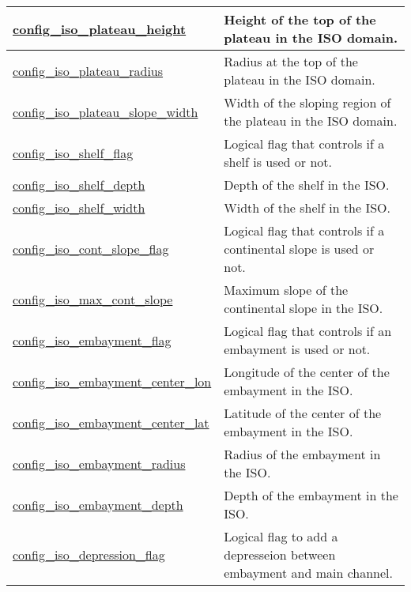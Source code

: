 {\begin{center}
\begin{longtable}{| p{2.0in} || p{4.0in} |}
    \hline
    \hyperref[subsec:nm_sec_config_iso_plateau_height]{config\_iso\_plateau\_height} & Height of the top of the plateau in the ISO domain. \\
    \hline
    \hyperref[subsec:nm_sec_config_iso_plateau_radius]{config\_iso\_plateau\_radius} & Radius at the top of the plateau in the ISO domain. \\
    \hline
    \hyperref[subsec:nm_sec_config_iso_plateau_slope_width]{config\_iso\_plateau\_slope\_\-width} & Width of the sloping region of the plateau in the ISO domain. \\
    \hline
    \hyperref[subsec:nm_sec_config_iso_shelf_flag]{config\_iso\_shelf\_flag} & Logical flag that controls if a shelf is used or not. \\
    \hline
    \hyperref[subsec:nm_sec_config_iso_shelf_depth]{config\_iso\_shelf\_depth} & Depth of the shelf in the ISO. \\
    \hline
    \hyperref[subsec:nm_sec_config_iso_shelf_width]{config\_iso\_shelf\_width} & Width of the shelf in the ISO. \\
    \hline
    \hyperref[subsec:nm_sec_config_iso_cont_slope_flag]{config\_iso\_cont\_slope\_flag} & Logical flag that controls if a continental slope is used or not. \\
    \hline
    \hyperref[subsec:nm_sec_config_iso_max_cont_slope]{config\_iso\_max\_cont\_slope} & Maximum slope of the continental slope in the ISO. \\
    \hline
    \hyperref[subsec:nm_sec_config_iso_embayment_flag]{config\_iso\_embayment\_flag} & Logical flag that controls if an embayment is used or not. \\
    \hline
    \hyperref[subsec:nm_sec_config_iso_embayment_center_lon]{config\_iso\_embayment\_center\_\-lon} & Longitude of the center of the embayment in the ISO. \\
    \hline
    \hyperref[subsec:nm_sec_config_iso_embayment_center_lat]{config\_iso\_embayment\_center\_\-lat} & Latitude of the center of the embayment in the ISO. \\
    \hline
    \hyperref[subsec:nm_sec_config_iso_embayment_radius]{config\_iso\_embayment\_radius} & Radius of the embayment in the ISO. \\
    \hline
    \hyperref[subsec:nm_sec_config_iso_embayment_depth]{config\_iso\_embayment\_depth} & Depth of the embayment in the ISO. \\
    \hline
    \hyperref[subsec:nm_sec_config_iso_depression_flag]{config\_iso\_depression\_flag} & Logical flag to add a depresseion between embayment and main channel. \\

\end{longtable}
\end{center}}
